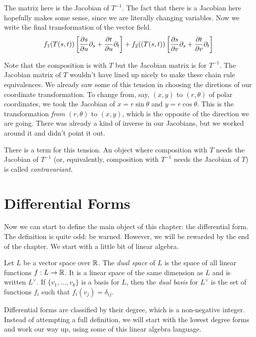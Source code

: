 \documentclass[fleqn,letterpaper]{report}
\begin{document}
The matrix here is the Jacobian of $T^{-1}$. The fact that there is
a Jacobian here hopefully makes some sense, since we are
literally changing variables. Now we write the final
transformation of the vector field. 
\begin{equation*}
f_1(T(s,t)) \left[ 
\frac{\partial s}{\partial u} \partial_s + 
\frac{\partial t}{\partial u} \partial_t \right] + 
f_2((T(s,t)) \left[ 
\frac{\partial s}{\partial v} \partial_s + 
\frac{\partial t}{\partial v} \partial_t \right]
\end{equation*}

Note that the composition is with $T$ but the Jacobian matrix
is for $T^{-1}$. The Jacobian matrix of $T$ wouldn't have
lined up nicely to make these chain rule equivalences. We
already saw some of this tension in choosing the diretions of
our coordinate transformation. To change from, say, $(x,y)$ to
$(r, \theta)$ of polar coordinates, we took the Jacobian of $x
= r \sin \theta$ and $y = r \cos \theta$. This is the
transformation \emph{from} $(r,\theta)$ to $(x,y)$, which is
the opposite of the direction we are going. There was already
a kind of inverse in our Jacobians, but we worked around it
and didn't point it out.

There is a term for this tension. An object where composition
with $T$ needs the Jacobian of $T^{-1}$ (or, equivalently,
composition with $T^{-1}$ needs the Jacobian of $T$) 
is called \emph{contravariant}. 

\section{Differential Forms}
\label{differential-forms}

Now we can start to define the main object of this chapter:
the differential form. The definition is quite odd: be warned.
However, we will be rewarded by the end of the chapter. 
We start with a little bit of linear algebra.

\begin{defn}
Let $L$ be a vector space over $\mathbb{R}$. The \emph{dual space} of
$L$ is the space of all linear functions $f: L \rightarrow
\mathbb{R}$. It is a linear space of the same dimension as $L$ and is
written $L^\vee$. If $\{v_1, \ldots, v_k\}$ is a basis for
$L$, then the \emph{dual basis} for $L^\vee$ is the set of
functions $f_i$ such that $f_i(v_j) = \delta_{ij}$.
\end{defn}

Differential forms are classified by their degree, which is a
non-negative integer. Instead of attempting a full definition,
we will start with the lowest degree forms and work our way
up, using some of this linear algebra language. 
\end{document}
